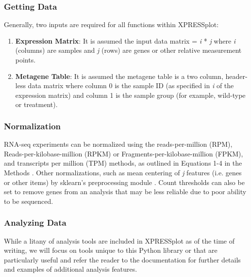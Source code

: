 \documentclass[11pt, a4paper, oneside]{article}
\begin{document}
\subsubsection{Getting Data}
Generally, two inputs are required for all functions within XPRESSplot:

\begin{enumerate}
  \item \textbf{Expression Matrix}: It is assumed the input data matrix = \textit{i} * \textit{j} where \textit{i} (columns) are samples and \textit{j} (rows) are genes or other relative measurement points.
  \item \textbf{Metagene Table}: It is assumed the metagene table is a two column, header-less data matrix where column 0 is the sample ID (as specified in \textit{i} of the expression matrix) and column 1 is the sample group (for example, wild-type or treatment).
\end{enumerate}

\subsubsection{Normalization}
RNA-seq experiments can be normalized using the reads-per-million (RPM), Reads-per-kilobase-million (RPKM) or Fragments-per-kilobase-million (FPKM), and transcripts per million (TPM) methods, as outlined in Equations 1-4 in the Methods \cite{evans_briefbio}. Other normalizations, such as mean centering of \textit{j} features (i.e. genes or other items) by sklearn's preprocessing module \cite{scikit_learn}. Count thresholds can also be set to remove genes from an analysis that may be less reliable due to poor ability to be sequenced.

\subsubsection{Analyzing Data}

While a litany of analysis tools are included in XPRESSplot as of the time of writing, we will focus on tools unique to this Python library or that are particularly useful and refer the reader to the documentation for further details and examples of additional analysis features.
\end{document}
